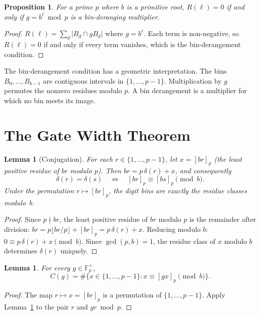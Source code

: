 \documentclass[12pt]{amsart}
\newtheorem{lemma}[theorem]{Lemma}
\newtheorem{proposition}[theorem]{Proposition}
\theoremstyle{definition}
\theoremstyle{remark}
\begin{document}
\begin{proposition}\label{prop:derangement-equiv}
For a prime $p$ where $b$ is a primitive root,
$R(\ell) = 0$ if and only if $g = b^{\ell} \bmod p$ is a
bin-deranging multiplier.
\end{proposition}

\begin{proof}
$R(\ell) = \sum_d |B_d \cap g B_d|$ where $g = b^{\ell}$.
Each term is non-negative, so $R(\ell) = 0$ if and only if
every term vanishes, which is the bin-derangement condition.
\end{proof}

The bin-derangement condition has a geometric interpretation.
The bins $B_0, \ldots, B_{b-1}$ are contiguous intervals in
$\{1,\ldots,p-1\}$. Multiplication by $g$ permutes the nonzero
residues modulo $p$. A bin derangement is a multiplier for which
no bin meets its image.

\section{The Gate Width Theorem}

\begin{lemma}[Conjugation]\label{lem:conjugation}
For each $r \in \{1, \ldots, p{-}1\}$, let $x = [br]_p$ (the
least positive residue of $br$ modulo $p$). Then
$br = p\,\delta(r) + x$, and consequently
\[
\delta(r) = \delta(s)
\quad\Longleftrightarrow\quad
[br]_p \equiv [bs]_p \pmod{b}.
\]
Under the permutation $r \mapsto [br]_p$, the digit bins are
exactly the residue classes modulo~$b$.
\end{lemma}

\begin{proof}
Since $p \nmid br$, the least positive residue of $br$ modulo $p$
is the remainder after division: $br = p\lfloor br/p \rfloor +
[br]_p = p\,\delta(r) + x$. Reducing modulo $b$:
$0 \equiv p\,\delta(r) + x \pmod{b}$. Since $\gcd(p,b) = 1$,
the residue class of $x$ modulo $b$ determines $\delta(r)$
uniquely.
\end{proof}

\begin{lemma}\label{lem:collision-congruence}
For every $g \in \mathbb{F}_p^{\times}$,
\[
C(g) = \#\{x \in \{1, \ldots, p{-}1\} :
x \equiv [gx]_p \pmod{b}\}.
\]
\end{lemma}

\begin{proof}
The map $r \mapsto x = [br]_p$ is a permutation of
$\{1, \ldots, p{-}1\}$. Apply Lemma~\ref{lem:conjugation} to
the pair $r$ and $gr \bmod p$.
\end{proof}
\end{document}

